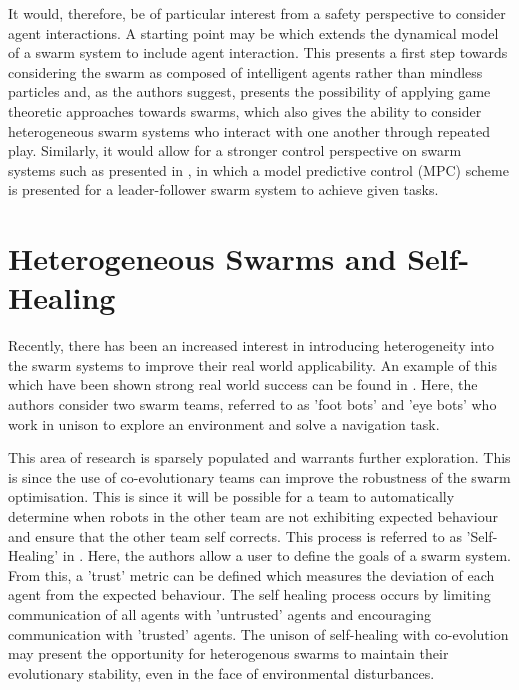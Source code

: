 \documentclass[../sample.tex]{subfiles}
\begin{document}
It would, therefore, be of particular interest from a safety perspective to consider agent
interactions. A starting point may be \cite{Bellomo2017} which extends the dynamical model of a
swarm system to include agent interaction. This presents a first step towards considering the swarm
as composed of intelligent agents rather than mindless particles and, as the authors suggest,
presents the possibility of applying game theoretic approaches towards swarms, which also gives the
ability to consider heterogeneous swarm systems who interact with one another through repeated play.
Similarly, it would allow for a stronger control perspective on swarm systems such as presented in
\cite{Borzi2015}, in which a model predictive control (MPC) scheme is presented for a
leader-follower swarm system to achieve given tasks. 


\section{Heterogeneous Swarms and Self-Healing}

Recently, there has been an increased interest in introducing heterogeneity into the swarm systems
to improve their real world applicability. An example of this which have been shown strong real
world success can be found in \cite{DucatelleSelf-organizedSwarms}. Here, the authors consider two
swarm teams, referred to as 'foot bots' and 'eye bots' who work in unison to explore an environment
and solve a navigation task.


This area of research is sparsely populated and warrants further exploration. This is since the use
of co-evolutionary teams can improve the robustness of the swarm optimisation. This is since it will
be possible for a team to automatically determine when robots in the other team are not exhibiting
expected behaviour and ensure that the other team self corrects. This process is referred to as
'Self-Healing' in \cite{LiuTrust-Aware}. Here, the authors allow a user to define the goals of a
swarm system. From this, a 'trust' metric can be defined which measures the deviation of each agent
from the expected behaviour. The self healing process occurs by limiting communication of all agents
with 'untrusted' agents and encouraging communication with 'trusted' agents. The unison of
self-healing with co-evolution may present the opportunity for heterogenous swarms to maintain their
evolutionary stability, even in the face of environmental disturbances. 
\end{document}
